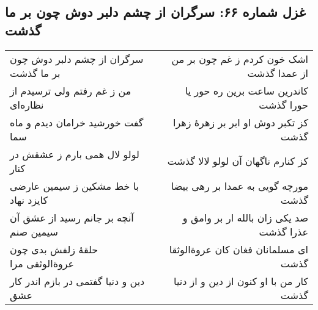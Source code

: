 \begin{center}
\section*{غزل شماره ۶۶: سرگران از چشم دلبر دوش چون بر ما گذشت}
\label{sec:066}
\begin{longtable}{l p{0.5cm} r}
سرگران از چشم دلبر دوش چون بر ما گذشت
&&
اشک خون کردم ز غم چون بر من از عمدا گذشت
\\
من ز غم رفتم ولی ترسیدم از نظاره‌ای
&&
کاندرین ساعت برین ره حور یا حورا گذشت
\\
گفت خورشید خرامان دیدم و ماه سما
&&
کز تکبر دوش او ابر بر زهرهٔ زهرا گذشت
\\
لولو لال همی بارم ز عشقش در کنار
&&
کز کنارم ناگهان آن لولو لالا گذشت
\\
با خط مشکین ز سیمین عارضی کایزد نهاد
&&
مورچه گویی به عمدا بر رهی بیضا گذشت
\\
آنچه بر جانم رسید از عشق آن سیمین صنم
&&
صد یکی زان بالله ار بر وامق و عذرا گذشت
\\
حلقهٔ زلفش بدی چون عروةالوثقی مرا
&&
ای مسلمانان فغان کان عروةالوثقا گذشت
\\
دین و دنیا گفتمی در بازم اندر کار عشق
&&
کار من با او کنون از دین و از دنیا گذشت
\\
\end{longtable}
\end{center}
